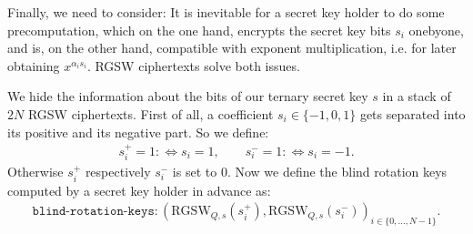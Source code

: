 \documentclass[letterpaper,10pt,english]{jupyterBook}
\begin{document}
\sphinxAtStartPar
Finally, we need to consider:
It is inevitable for a secret key holder to do some precomputation, which on the one hand, encrypts the secret key bits \(s_i\) one\sphinxhyphen{}by\sphinxhyphen{}one, and is, on the other hand, compatible with exponent multiplication, i.e. for later obtaining \(x^{\alpha_i s_i}\).
RGSW ciphertexts solve both issues.

\begin{DUlineblock}{0em}
\item[] 
\end{DUlineblock}

\sphinxAtStartPar
We hide the information about the bits of our ternary secret key \(s\) in a stack of \(2N\) RGSW ciphertexts.
First of all, a coefficient \(s_i \in \{-1,0,1\}\) gets separated into its positive and its negative part.
So we define:
\begin{equation*}
\begin{split}s_i^+ = 1 :\iff s_i = 1, \qquad s_i^- = 1 :\iff s_i = -1.\end{split}
\end{equation*}
\sphinxAtStartPar
Otherwise \(s_i^+\) respectively \(s_i^-\) is set to \(0\).
Now we define the blind rotation keys computed by a secret key holder in advance as:
\begin{equation*}
\begin{split}\texttt{blind-rotation-keys}: (\mathrm{RGSW}_{Q,s}(s_i^+), \mathrm{RGSW}_{Q,s}(s_i^-))_{i \in \{0,\dots,N-1\}}.\end{split}
\end{equation*}
\end{document}
